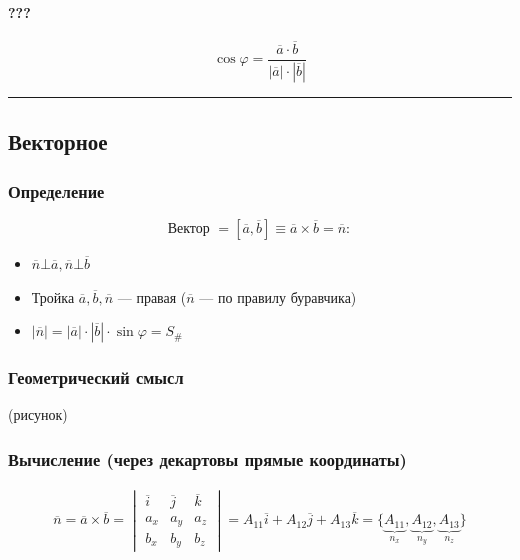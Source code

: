 \documentclass{article}
\begin{document}
\paragraph{???}
\[
    \cos \varphi = \frac{\overline{a} \cdot \overline{b}}{|\overline{a}| \cdot |\overline{b}|}
\]


\par\noindent\rule{\textwidth}{1pt}
\subsection{Векторное}

\subsubsection{Определение}
\[
    \text{Вектор } = \left[ \overline{a}, \overline{b} \right] \equiv \overline{a} \times \overline{b} = \overline{n}:
\]
\begin{itemize}
    \item $\overline{n} \bot \overline{a}, \overline{n} \bot \overline{b}$
    \item Тройка $\overline{a}, \overline{b}, \overline{n}$ --- правая ($\overline{n}$ --- по правилу буравчика)
    \item $|\overline{n}| = |\overline{a}| \cdot |\overline{b}| \cdot \sin \varphi = S_{\#}$
\end{itemize}


\subsubsection{Геометрический смысл}
(рисунок)

\subsubsection{Вычисление (через декартовы прямые координаты)}
\begin{gather*}
    \overline{n} = \overline{a} \times \overline{b} =
    \begin{vmatrix}
        \overline{i} & \overline{j} & \overline{k} \\
        a_x          & a_y          & a_z          \\
        b_x          & b_y          & b_z
    \end{vmatrix} =
    A_{11} \overline{i} + A_{12} \overline{j} + A_{13} \overline{k} =
    \{\underbrace{A_{11}}_{n_x}, \underbrace{A_{12}}_{n_y}, \underbrace{A_{13}}_{n_z}\}
\end{gather*}
\end{document}
